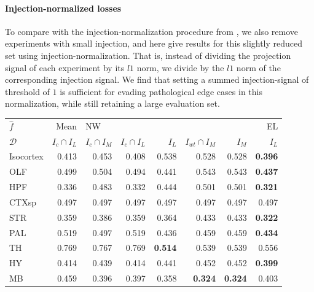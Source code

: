 \newpage

\paragraph{Injection-normalized losses}
To compare with the injection-normalization procedure from \citet{Knox2019-ot}, we also remove experiments with small injection, and here give results for this slightly reduced set using injection-normalization.
That is, instead of dividing the projection signal of each experiment by its $l1$ norm, we divide by the $l1$ norm of the corresponding injection signal.
We find that setting a summed injection-signal of threshold of $1$ is sufficient for evading pathological edge cases in this normalization, while still retaining a large evaluation set.

\begin{table}[H]
\begin{tabular}{lrrrrrrr}
\toprule
$\widehat f$ &           Mean & \multicolumn{5}{l}{NW} &     EL \\
$\mathcal D$ & $I_c \cap I_L$ & $I_c \cap I_M$ & $I_c \cap I_L$ &  $I_L$ & $I_{wt} \cap I_M$ &  $I_M$ &  $I_L$ \\
\midrule
Isocortex &          0.413 &          0.453 &          0.408 &  0.538 &             0.528 &  0.528 &  \textbf{0.396} \\
OLF       &          0.499 &          0.504 &          0.494 &  0.441 &             0.543 &  0.543 &  \textbf{0.437} \\
HPF       &          0.336 &          0.483 &          0.332 &  0.444 &             0.501 &  0.501 & \textbf{ 0.321} \\
CTXsp     &          0.497 &          0.497 &          0.497 &  0.497 &             0.497 &  0.497 &  0.497 \\
STR       &          0.359 &          0.386 &          0.359 &  0.364 &             0.433 &  0.433 &\textbf{  0.322} \\
PAL       &          0.519 &          0.497 &          0.519 &  0.436 &             0.459 &  0.459 &\textbf{  0.434} \\
TH        &          0.769 &          0.767 &          0.769 &  \textbf{0.514} &             0.539 &  0.539 &  0.556 \\
HY        &          0.414 &          0.439 &          0.414 &  0.441 &             0.452 &  0.452 & \textbf{ 0.399} \\
MB        &          0.459 &          0.396 &          0.397 &  0.358 &         \textbf{    0.324 }& \textbf{ 0.324 }&  0.403 \\

\end{tabular}
\end{table}
